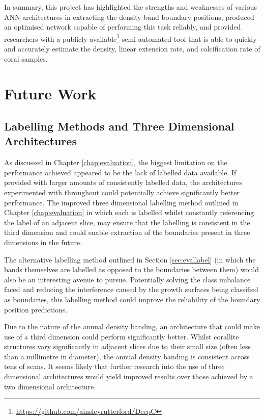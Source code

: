 In summary, this project has highlighted the strengths and weaknesses of various ANN architectures in extracting the density band boundary positions, produced an optimised network capable of performing this task reliably, and provided researchers with a publicly available\footnote{\url{https://github.com/ainsleyrutterford/DeepC}} semi-automated tool that is able to quickly and accurately estimate the density, linear extension rate, and calcification rate of coral samples.

\section{Future Work}

\subsection{Labelling Methods and Three Dimensional Architectures}

As discussed in Chapter \ref{chap:evaluation}, the biggest limitation on the performance achieved appeared to be the lack of labelled data available. If provided with larger amounts of consistently labelled data, the architectures experimented with throughout could potentially achieve significantly better performance. The improved three dimensional labelling method outlined in Chapter \ref{chap:evaluation} in which each is labelled whilst constantly referencing the label of an adjacent slice, may ensure that the labelling is consistent in the third dimension and could enable extraction of the boundaries present in three dimensions in the future.

The alternative labelling method outlined in Section \ref{sec:evallabel} (in which the bands themselves are labelled as opposed to the boundaries between them) would also be an interesting avenue to pursue. Potentially solving the class imbalance faced and reducing the interference caused by the growth surfaces being classified as boundaries, this labelling method could improve the reliability of the boundary position predictions.

Due to the nature of the annual density banding, an architecture that could make use of a third dimension could perform significantly better. Whilst corallite structures vary significantly in adjacent slices due to their small size (often less than a millimetre in diameter), the annual density banding is consistent across tens of scans. It seems likely that further research into the use of three dimensional architectures would yield improved results over those achieved by a two dimensional architecture.

